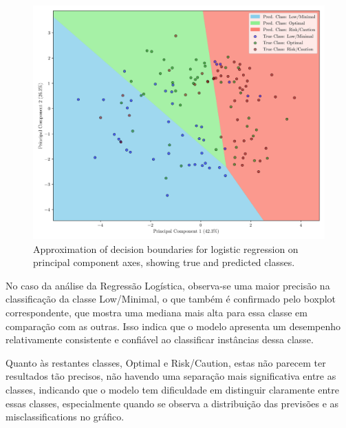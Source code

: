 \documentclass[conference]{IEEEtran}
\begin{document}
\begin{figure}[H]
    \centering
    \includegraphics[width=1\linewidth]{assets/pca_reglog.png}
    \caption{Approximation of decision boundaries for logistic regression on principal component axes, showing true and predicted classes.}
    \label{pca_reglog}
\end{figure}

No caso da análise da Regressão Logística, observa-se uma maior precisão na classificação da classe Low/Minimal, o que também é confirmado pelo boxplot correspondente, que mostra uma mediana mais alta para essa classe em comparação com as outras. Isso indica que o modelo apresenta um desempenho relativamente consistente e confiável ao classificar instâncias dessa classe. 

Quanto às restantes classes, Optimal e Risk/Caution, estas não parecem ter resultados tão precisos, não havendo uma separação mais significativa entre as classes, indicando que o modelo tem dificuldade em distinguir claramente entre essas classes, especialmente quando se observa a distribuição das previsões e as misclassifications no gráfico.
\end{document}
